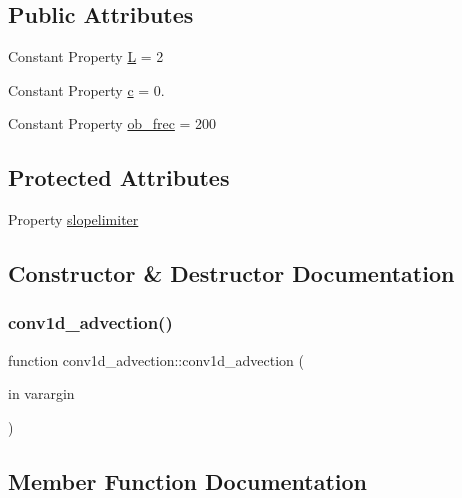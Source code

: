 \subsection*{Public Attributes}
\begin{DoxyCompactItemize}
\item 
Constant Property \hyperlink{classconv1d__advection_aa2e5365b62230da10a6ad2b51075f775}{L} = 2
\item 
Constant Property \hyperlink{classconv1d__advection_adebbab228153451655990cf9dc3ecc61}{c} = 0.
\item 
Constant Property \hyperlink{classconv1d__advection_a54fb1aca5b022935bf81f97fb2f70551}{ob\+\_\+frec} = 200
\end{DoxyCompactItemize}
\subsection*{Protected Attributes}
\begin{DoxyCompactItemize}
\item 
Property \hyperlink{classconv1d__advection_afe0ed6735a693af3b1febc0959133fa3}{slopelimiter}
\end{DoxyCompactItemize}


\subsection{Constructor \& Destructor Documentation}
\mbox{\label{classconv1d__advection_ac4456f6ccc1c883c1168eb8d84a81e3a}} 
\subsubsection{\texorpdfstring{conv1d\+\_\+advection()}{conv1d\_advection()}}
{\footnotesize\ttfamily function conv1d\+\_\+advection\+::conv1d\+\_\+advection (\begin{DoxyParamCaption}\item[{in}]{varargin }\end{DoxyParamCaption})}



\subsection{Member Function Documentation}
\mbox{\label{classconv1d__advection_a9d3767628bcfe2980fc623cf1e07f046}} 
